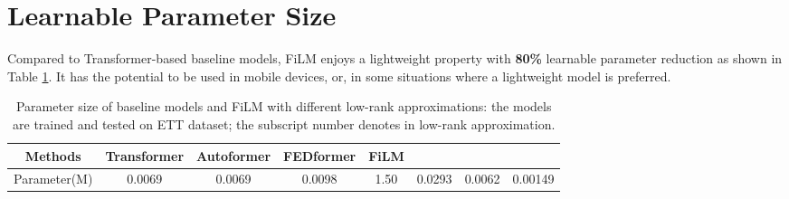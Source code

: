 \documentclass{article}
\begin{document}
\begin{table}[h]
\centering
\caption{P-values of Kolmogrov-Smirnov test of different Transformer models for long-term forecasting output on ETTm1 and ETTm2 dataset. Larger value indicates the hypothesis (the input sequence and forecasting output come from the same distribution) is less likely to be rejected. The largest results are highlighted.}
\begin{small}
\vskip 0.05in
\label{tab:KStest_small}
\end{small}
\vskip -0.1in
\end{table}


  \section{Learnable Parameter Size}
\label{app:sec:learnable_para_size}

Compared to Transformer-based baseline models, FiLM enjoys a lightweight property with \textbf{80\%} learnable parameter reduction as shown in Table \ref{tab:size}. It has the potential to be used in mobile devices, or, in some situations where a lightweight model is preferred.

\begin{table}[h]
\centering
\caption{Parameter size of baseline models and FiLM with different low-rank approximations: the models are trained and tested on ETT dataset; the subscript number denotes  in low-rank approximation.}
\begin{small}
\vskip 0.05in
\begin{tabular}{c|ccccccc}
\toprule
Methods&Transformer&Autoformer&FEDformer&FiLM& &  & \\
\midrule
Parameter(M) & 0.0069 & 0.0069& 0.0098& 1.50 & 0.0293 &0.0062& 0.00149 \\
\bottomrule
\end{tabular}
\label{tab:size}
\end{small}
\vskip -0.1in
\end{table}
 
\end{document}
